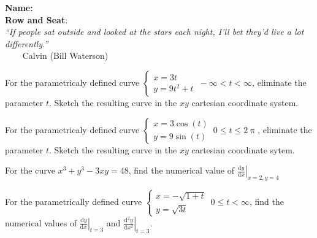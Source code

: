 \documentclass[12pt,fleqn]{exam}
\newcommand{\class}{MATH 202, Fall \the\year}
\begin{document}
\large
\noindent\makebox[3.0truein][l]{\textbf{\class}}
\textbf{Name:} \hrulefill \\
\noindent {}
\textbf{Row and Seat}:\hrulefill\\





\noindent \emph{“If people sat outside and looked at 
the stars each night, I’ll bet they’d live a lot differently.”}\\
  $\phantom{xxx}$ \hfill {\sc Calvin (Bill Waterson)}


\begin{questions} 
    
  
\question For the parametricaly defined curve $\begin{cases}
      x = 3 t \\ y = 9 t^2 + t \end{cases} \, -\infty < t < \infty$,
      eliminate the parameter $t$. Sketch the resulting curve in
      the $xy$ cartesian coordinate system.

\begin{solution}[2.5in]
\end{solution}

\question For the parametricaly defined curve $\begin{cases}
    x = 3 \cos(t) \\ y = 9 \sin(t) \end{cases} \, 0 \leq  t \leq 2 \uppi$,
    eliminate the parameter $t$. Sketch the resulting curve in
    the $xy$ cartesian coordinate sytem.

\begin{solution}%
\end{solution}

\newpage


\question For the curve $x^3 + y^3 - 3 x y = 48$, find the 
numerical value of $\displaystyle 
\left . \frac{\mathrm{d} y}{\mathrm{d}x} \right |_{x=2,y=4}$
\begin{solution}[3.5in]
\end{solution}

\question For the parametrically defined curve 
$\displaystyle \begin{cases} x = -\sqrt{1+t} \\ y = \sqrt{3t} 
\end{cases} \, 0 \leq t < \infty$, find the numerical values 
of $\left . \frac{\mathrm{d} y}{\mathrm{d}x} \right |_{t=3}$
and $\left . \frac{\mathrm{d}^2 y}{\mathrm{d} x^2} \right |_{t=3}$.


\end{questions}
\end{document}
